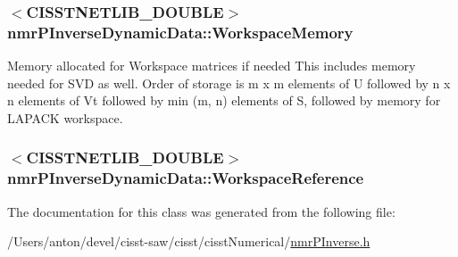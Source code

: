 \subsubsection[{Workspace\+Memory}]{$<$C\+I\+S\+S\+T\+N\+E\+T\+L\+I\+B\+\_\+\+D\+O\+U\+B\+L\+E$>$ nmr\+P\+Inverse\+Dynamic\+Data\+::\+Workspace\+Memory\hspace{0.3cm}{\ttfamily [protected]}}\label{classnmr_p_inverse_dynamic_data_a799d81175e96446fe8ab3553befd26ee}
Memory allocated for Workspace matrices if needed This includes memory needed for S\+V\+D as well. Order of storage is m x m elements of U followed by n x n elements of Vt followed by min (m, n) elements of S, followed by memory for L\+A\+P\+A\+C\+K workspace. \hypertarget{classnmr_p_inverse_dynamic_data_af51319d4e7f6a0693f3f23ed52220b5a}{}
\subsubsection[{Workspace\+Reference}]{$<$C\+I\+S\+S\+T\+N\+E\+T\+L\+I\+B\+\_\+\+D\+O\+U\+B\+L\+E$>$ nmr\+P\+Inverse\+Dynamic\+Data\+::\+Workspace\+Reference\hspace{0.3cm}{\ttfamily [protected]}}\label{classnmr_p_inverse_dynamic_data_af51319d4e7f6a0693f3f23ed52220b5a}


The documentation for this class was generated from the following file\+:\begin{DoxyCompactItemize}
\item 
/\+Users/anton/devel/cisst-\/saw/cisst/cisst\+Numerical/\hyperlink{nmr_p_inverse_8h}{nmr\+P\+Inverse.\+h}\end{DoxyCompactItemize}
